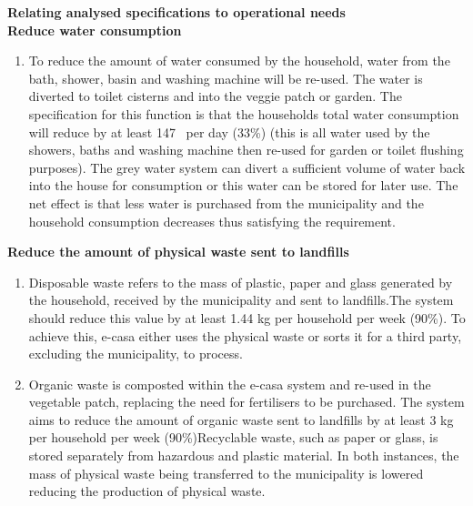 \documentclass[a4paper,11pt,fleqn]{report}
\begin{document}
\noindent\textbf{Relating analysed specifications to operational needs}\\

\noindent\textbf{Reduce water consumption}
\begin{enumerate}
\item To reduce the amount of water consumed by the household, water from the bath, shower, basin and washing machine will be re-used. The water is diverted to toilet cisterns and into the veggie patch or garden. The specification for this function is that the households total water consumption will reduce by at least 147~ per day (33\%) (this is all water used by the showers, baths and washing machine then re-used for garden or toilet flushing purposes). The grey water system can divert a sufficient volume of water back into the house for consumption or this water can be stored for later use. The net effect is that less water is purchased from the municipality and the household consumption decreases thus satisfying the requirement.
\end{enumerate}

\noindent\textbf{Reduce the amount of physical waste sent to landfills}
\begin{enumerate}
\item Disposable waste refers to the mass of plastic, paper and glass generated by the household, received by the municipality and sent to landfills.The system should reduce this value by at least 1.44 kg per household per week (90\%). To achieve this, e-casa either uses the physical waste or sorts it for a third party, excluding the municipality, to process. 
\item Organic waste is composted within the e-casa system and re-used in the vegetable patch, replacing the need for fertilisers to be purchased. The system aims to reduce the amount of organic waste sent to landfills by at least 3 kg per household per week (90\%)Recyclable waste, such as paper or glass, is stored separately from hazardous and plastic material. In both instances, the mass of physical waste being transferred to the municipality is lowered reducing the production of physical waste.
\end{enumerate}
\end{document}
